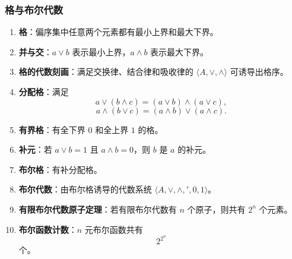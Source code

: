 \subsubsection{格与布尔代数}

\begin{enumerate}
	\item \textbf{格}：偏序集中任意两个元素都有最小上界和最大下界。
	\item \textbf{并与交}：\(a\vee b\) 表示最小上界，\(a\wedge b\) 表示最大下界。
	\item \textbf{格的代数刻画}：满足交换律、结合律和吸收律的 \(\langle A,\vee,\wedge\rangle\) 可诱导出格序。
	\item \textbf{分配格}：满足
	\[
	a\vee(b\wedge c)=(a\vee b)\wedge(a\vee c),
	\]
	\[
	a\wedge(b\vee c)=(a\wedge b)\vee(a\wedge c).
	\]
	\item \textbf{有界格}：有全下界 \(0\) 和全上界 \(1\) 的格。
	\item \textbf{补元}：若 \(a\vee b=1\) 且 \(a\wedge b=0\)，则 \(b\) 是 \(a\) 的补元。
	\item \textbf{布尔格}：有补分配格。
	\item \textbf{布尔代数}：由布尔格诱导的代数系统 \(\langle A,\vee,\wedge,{}'\!,0,1\rangle\)。
	\item \textbf{有限布尔代数原子定理}：若有限布尔代数有 \(n\) 个原子，则共有 \(2^n\) 个元素。
	\item \textbf{布尔函数计数}：\(n\) 元布尔函数共有
	\[
	2^{2^n}
	\]
	个。
\end{enumerate}
